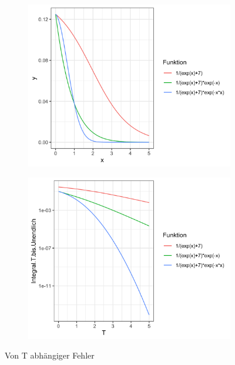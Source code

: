 \documentclass[12pt,a4paper]{scrartcl}
\numberwithin{equation}{section}
\numberwithin{myalgctr}{section}
\numberwithin{mytheoremctr}{section}
\numberwithin{mykorollarctr}{section}
\numberwithin{mylemmactr}{section}
\numberwithin{mybeispielctr}{section}
\begin{document}
	
	\begin{figure}[H]
		\begin{subfigure}[t]{0.5\textwidth}
			
			\includegraphics[width=\linewidth]{../plots/aufgabe-e-vergleich.png}
			\label{fig:f-vergleich}
			
		\end{subfigure}
		\begin{subfigure}[t]{0.5\textwidth}
			\includegraphics[width=\linewidth]{../plots/aufgabe-e-vergleich-integral.png}
			\label{fig:f-vergleich-int}
		\end{subfigure}
		\caption{Von T abh\"angiger Fehler}
	\end{figure}
\end{document}
